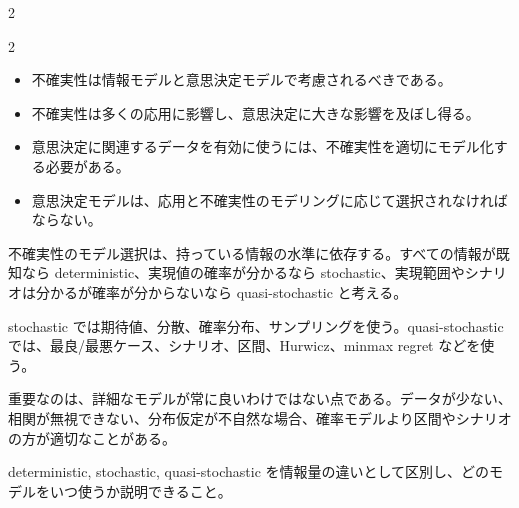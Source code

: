 \begin{multicols}{2}
\end{multicols}

\clearpage



\vspace{1.5mm}

\begin{multicols}{2}

\footnotesize

\raggedcolumns


\begin{itemize}
\item 不確実性は情報モデルと意思決定モデルで考慮されるべきである。
\item 不確実性は多くの応用に影響し、意思決定に大きな影響を及ぼし得る。
\item 意思決定に関連するデータを有効に使うには、不確実性を適切にモデル化する必要がある。
\item 意思決定モデルは、応用と不確実性のモデリングに応じて選択されなければならない。
\end{itemize}

不確実性のモデル選択は、持っている情報の水準に依存する。すべての情報が既知なら deterministic、実現値の確率が分かるなら stochastic、実現範囲やシナリオは分かるが確率が分からないなら quasi-stochastic と考える。\par

stochastic では期待値、分散、確率分布、サンプリングを使う。quasi-stochastic では、最良/最悪ケース、シナリオ、区間、Hurwicz、minmax regret などを使う。\par

重要なのは、詳細なモデルが常に良いわけではない点である。データが少ない、相関が無視できない、分布仮定が不自然な場合、確率モデルより区間やシナリオの方が適切なことがある。\par

deterministic, stochastic, quasi-stochastic を情報量の違いとして区別し、どのモデルをいつ使うか説明できること。\par


\end{multicols}
